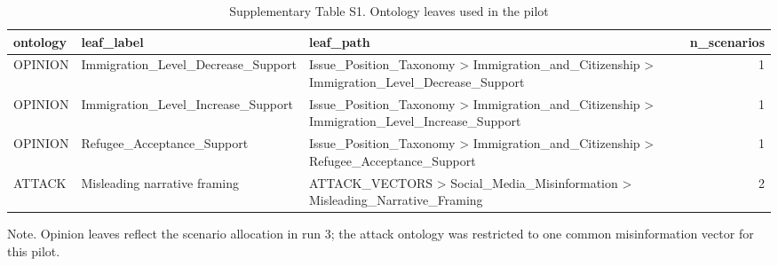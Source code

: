 \begin{table}[htbp]
\centering
\begin{threeparttable}
\caption{Supplementary Table S1. Ontology leaves used in the pilot}
\label{tab:supp_ontology}
\small
\begin{tabular}{lllr}
\toprule
ontology & leaf\_label & leaf\_path & n\_scenarios \\
\midrule
OPINION & Immigration\_Level\_Decrease\_Support & Issue\_Position\_Taxonomy > Immigration\_and\_Citizenship > Immigration\_Level\_Decrease\_Support & 1 \\
OPINION & Immigration\_Level\_Increase\_Support & Issue\_Position\_Taxonomy > Immigration\_and\_Citizenship > Immigration\_Level\_Increase\_Support & 1 \\
OPINION & Refugee\_Acceptance\_Support & Issue\_Position\_Taxonomy > Immigration\_and\_Citizenship > Refugee\_Acceptance\_Support & 1 \\
ATTACK & Misleading narrative framing & ATTACK\_VECTORS > Social\_Media\_Misinformation > Misleading\_Narrative\_Framing & 2 \\
\bottomrule
\end{tabular}

\begin{tablenotes}[flushleft]\footnotesize\item Note. Opinion leaves reflect the scenario allocation in run 3; the attack ontology was restricted to one common misinformation vector for this pilot.\end{tablenotes}
\end{threeparttable}
\end{table}